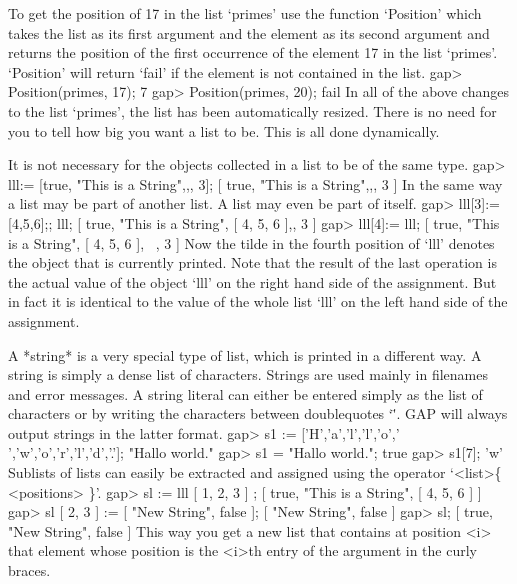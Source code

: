 To get the position    of 17 in  the   list  `primes' use   the  function
`Position' which takes the list as its  first argument and the element as
its second argument  and returns the position of  the first occurrence of
the element 17 in the list `primes'. `Position' will return `fail' if the
element is not contained in the list.
\beginexample
    gap> Position(primes, 17);
    7
    gap> Position(primes, 20);
    fail
\endexample
In  all  of the  above changes to  the  list `primes',  the list has been
automatically resized.  There  is no need  for you to tell {\GAP} how big
you want a list to be.  This is all done dynamically.

It is not necessary for the objects collected in a list to be of the same
type.
\beginexample
    gap> lll:= [true, "This is a String",,, 3];
    [ true, "This is a String",,, 3 ] 
\endexample
In the same way a list may be part of another  list.  A list  may even be
part of itself.
\beginexample
    gap> lll[3]:= [4,5,6];; lll;
    [ true, "This is a String", [ 4, 5, 6 ],, 3 ]
    gap> lll[4]:= lll;
    [ true, "This is a String", [ 4, 5, 6 ], ~, 3 ] 
\endexample
Now the tilde in the fourth position of `lll'  denotes the object that is
currently  printed. Note that  the result  of the  last operation is  the
actual value  of  the  object  `lll'   on  the  right  hand side  of  the
assignment. But in  fact it is  identical to the value  of the whole list
`lll' on the left hand side of the assignment.

A *string* is   a very  special type  of  list,  which  is printed in   a
different way. A string is simply a dense list of characters. Strings are
used mainly in filenames and error messages. A  string literal can either
be entered simply as the list of  characters or by writing the characters
between  doublequotes `\"'. GAP will  always output strings in the latter
format.
\beginexample
    gap> s1 := ['H','a','l','l','o',' ','w','o','r','l','d','.'];
    "Hallo world."
    gap> s1 = "Hallo world.";
    true
    gap> s1[7];
    'w' 
\endexample
Sublists of lists can easily be extracted and assigned using the operator
`<list>\{ <positions> \}'.
\beginexample
    gap> sl := lll{ [ 1, 2, 3 ] };
    [ true, "This is a String", [ 4, 5, 6 ] ]
    gap> sl{ [ 2, 3 ] } := [ "New String", false ];
    [ "New String", false ]
    gap> sl;
    [ true, "New String", false ] 
\endexample
This way you get  a new list that  contains at position <i> that  element
whose position is the <i>th entry of the argument in the curly braces.

